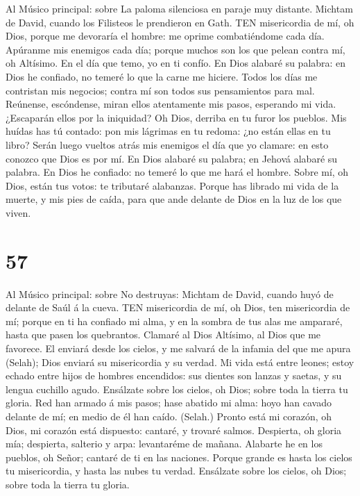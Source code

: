  Al Músico principal: sobre La paloma silenciosa en paraje
muy distante. Michtam de David, cuando los Filisteos le prendieron en
Gath. TEN misericordia de mí, oh Dios, porque me devoraría el hombre: me
oprime combatiéndome cada día.  Apúranme mis enemigos cada
día; porque muchos son los que pelean contra mí, oh Altísimo.
 En el día que temo, yo en ti confío.  En Dios
alabaré su palabra: en Dios he confiado, no temeré lo que la carne me
hiciere.  Todos los días me contristan mis negocios; contra
mí son todos sus pensamientos para mal.  Reúnense,
escóndense, miran ellos atentamente mis pasos, esperando mi vida.
 ¿Escaparán ellos por la iniquidad? Oh Dios, derriba en tu
furor los pueblos.  Mis huídas has tú contado: pon mis
lágrimas en tu redoma: ¿no están ellas en tu libro?  Serán
luego vueltos atrás mis enemigos el día que yo clamare: en esto conozco
que Dios es por mí.  En Dios alabaré su palabra; en Jehová
alabaré su palabra.  En Dios he confiado: no temeré lo que
me hará el hombre.  Sobre mí, oh Dios, están tus votos: te
tributaré alabanzas.  Porque has librado mi vida de la
muerte, y mis pies de caída, para que ande delante de Dios en la luz de
los que viven.

\hypertarget{section-56}{%
\section{57}\label{section-56}}

 Al Músico principal: sobre No destruyas: Michtam de David,
cuando huyó de delante de Saúl á la cueva. TEN misericordia de mí, oh
Dios, ten misericordia de mí; porque en ti ha confiado mi alma, y en la
sombra de tus alas me ampararé, hasta que pasen los quebrantos.
 Clamaré al Dios Altísimo, al Dios que me favorece.
 El enviará desde los cielos, y me salvará de la infamia del
que me apura (Selah); Dios enviará su misericordia y su verdad.
 Mi vida está entre leones; estoy echado entre hijos de
hombres encendidos: sus dientes son lanzas y saetas, y su lengua
cuchillo agudo.  Ensálzate sobre los cielos, oh Dios; sobre
toda la tierra tu gloria.  Red han armado á mis pasos; hase
abatido mi alma: hoyo han cavado delante de mí; en medio de él han
caído. (Selah.)  Pronto está mi corazón, oh Dios, mi corazón
está dispuesto: cantaré, y trovaré salmos.  Despierta, oh
gloria mía; despierta, salterio y arpa: levantaréme de mañana.
 Alabarte he en los pueblos, oh Señor; cantaré de ti en las
naciones.  Porque grande es hasta los cielos tu
misericordia, y hasta las nubes tu verdad.  Ensálzate sobre
los cielos, oh Dios; sobre toda la tierra tu gloria.

